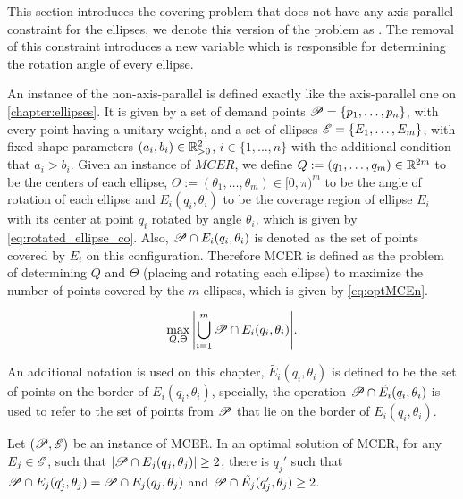 This section introduces the covering problem that does not have any axis-parallel constraint for the ellipses, we denote this version of the problem as . The removal of this constraint introduces a new variable which is responsible for determining the rotation angle of every ellipse.

An instance of the non-axis-parallel is defined exactly like the axis-parallel one on \autoref{chapter:ellipses}. It is given by a set of demand points $\mathscr{P}=\{p_1, \dots, p_n\}$, with every point having a unitary weight, and a set of ellipses $\mathscr{E}=\{E_1, \dots, E_m\}$, with fixed shape parameters $(a_i, b_i) \in \mathbb{R}^2_{>0}$, $i \in \{1, \dots, n\}$ with the additional condition that $a_i > b_i$. Given an instance of $MCER$, we define $Q:=(q_1, \dots, q_m) \in \mathbb{R}^{2m}$ to be the centers of each ellipse, $\Theta:=(\theta_1, \dots, \theta_m) \in [0, \pi)^m$ to be the angle of rotation of each ellipse and $E_i(q_i, \theta_i)$ to be the coverage region of ellipse $E_i$ with its center at point $q_i$ rotated by angle $\theta_i$, which is given by \autoref{eq:rotated_ellipse_co}.
Also, $\mathscr{P} \cap E_i(q_i, \theta_i)$ is denoted as the set of points covered by $E_i$ on this configuration. Therefore MCER is defined as the problem of determining $Q$ and $\Theta$ (placing and rotating each ellipse) to maximize the number of points covered by the $m$ ellipses, which is given by \autoref{eq:optMCEn}.

\begin{equation}\label{eq:optMCEn}
\max_{Q, \Theta}{\left|\bigcup_{i=1}^{m} \mathscr{P} \cap E_i(q_i, \theta_i)\right|}.
\end{equation}

An additional notation is used on this chapter, $\tilde{E_i}(q_i, \theta_i)$ is defined to be the set of points on the border of $E_i(q_i, \theta_i)$, specially, the operation $\mathscr{P} \cap \tilde{E_i}(q_i, \theta_i)$ is used to refer to the set of points from $\mathscr{P}$ that lie on the border of $E_i(q_i, \theta_i)$.


\begin{proposicao}\label{lema:mce_2b}
	Let $(\mathscr{P}, \mathscr{E})$ be an instance of MCER. In an optimal solution of MCER, for any $E_j \in \mathscr{E}$, such that $|\mathscr{P} \cap E_j(q_j, \theta_j)|\ge2$, there is $q_j'$ such that $\mathscr{P} \cap E_j(q_j', \theta_j)=\mathscr{P} \cap E_j(q_j, \theta_j)$ and $\mathscr{P} \cap \tilde{E_j}(q_j', \theta_j) \ge 2$.
\end{proposicao}

